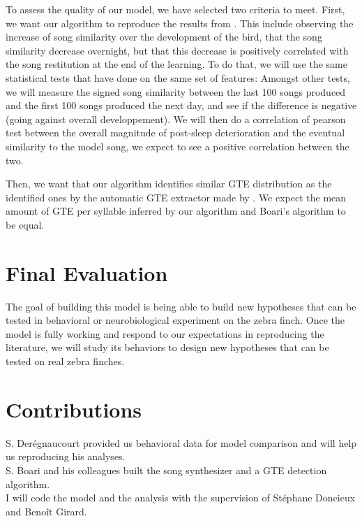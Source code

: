\documentclass[a4paper]{article}
\begin{document}
\begin{multicols}{2}
To assess the quality of our model, we have selected two criteria to meet.
First, we want our algorithm to reproduce the results from
\textcite{deregnaucourt_how_2005}. This include observing the increase of song
similarity \parencite{tchernichovski_procedure_2000} over the development of the
bird, that the song similarity decrease overnight, but that this decrease is
positively correlated with the song restitution at the end of the learning. To
do that, we will use the same statistical tests that
\textcite{deregnaucourt_how_2005} have done on the same set of features: Amongst
other tests, we will measure the signed song similarity between the last 100
songs produced and the first 100 songs produced the next day, and see if the
difference is negative (going against overall developpement). We will then do a
correlation of pearson test between the overall magnitude of post-sleep
deterioration and the eventual similarity to the model song, we expect to see a
positive correlation between the two.

Then, we want that our algorithm identifies similar GTE distribution as the
identified ones by the automatic GTE extractor made by
\textcite{boari_automatic_2015}. We expect the mean amount of GTE per syllable
inferred by our algorithm and Boari's algorithm to be equal.

\section*{Final Evaluation}

The goal of building this model is being able to build new hypotheses that can
be tested in behavioral or neurobiological experiment on the zebra finch. Once
the model is fully working and respond to our expectations in reproducing the
literature, we will study its behaviors to design new hypotheses that can
be tested on real zebra finches.

\section*{Contributions}

S. Derégnaucourt provided us behavioral data for model comparison and will help
us reproducing his analyses.\\
S. Boari and his colleagues built the song synthesizer and a GTE detection
algorithm.\\
I will code the model and the analysis with the supervision of Stéphane Doncieux
and Benoît Girard.\\

\printbibliography{}

\end{multicols}
\end{document}
